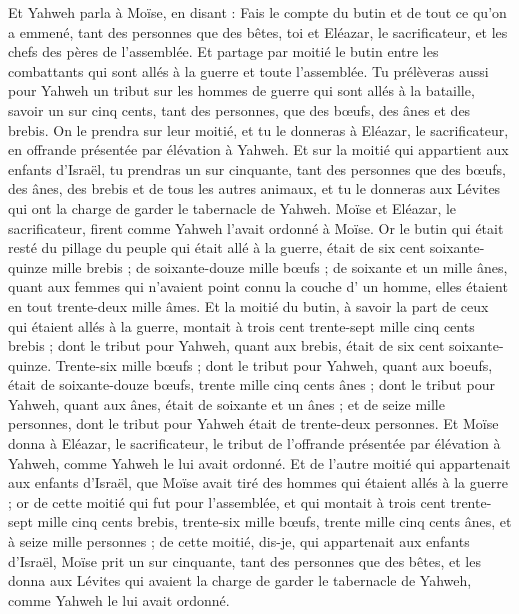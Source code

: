 \begin{multicols}{2}
Et Yahweh parla à Moïse, en disant :
Fais le compte du butin et de tout ce qu'on a emmené, tant des personnes que des bêtes, toi et Eléazar, le sacrificateur, et les chefs des pères de l'assemblée.
Et partage par moitié le butin entre les combattants qui sont allés à la guerre et toute l'assemblée.
Tu prélèveras aussi pour Yahweh un tribut sur les hommes de guerre qui sont allés à la bataille, savoir un sur cinq cents, tant des personnes, que des bœufs, des ânes et des brebis.
On le prendra sur leur moitié, et tu le donneras à Eléazar, le sacrificateur, en offrande présentée par élévation à Yahweh.
Et sur la moitié qui appartient aux enfants d'Israël, tu prendras un sur cinquante, tant des personnes que des bœufs, des ânes, des brebis et de tous les autres animaux, et tu le donneras aux Lévites qui ont la charge de garder le tabernacle de Yahweh.
Moïse et Eléazar, le sacrificateur, firent comme Yahweh l'avait ordonné à Moïse.
Or le butin qui était resté du pillage du peuple qui était allé à la guerre, était de six cent soixante-quinze mille brebis ;
de soixante-douze mille bœufs ;
de soixante et un mille ânes,
quant aux femmes qui n'avaient point connu la couche d' un homme, elles étaient en tout trente-deux mille âmes.
Et la moitié du butin, à savoir la part de ceux qui étaient allés à la guerre, montait à trois cent trente-sept mille cinq cents brebis ;
dont le tribut pour Yahweh, quant aux brebis, était de six cent soixante-quinze.
Trente-six mille bœufs ; dont le tribut pour Yahweh, quant aux boeufs, était de soixante-douze bœufs,
trente mille cinq cents ânes ; dont le tribut pour Yahweh, quant aux ânes, était de soixante et un ânes ;
et de seize mille personnes, dont le tribut pour Yahweh était de trente-deux personnes.
Et Moïse donna à Eléazar, le sacrificateur, le tribut de l'offrande présentée par élévation à Yahweh, comme Yahweh le lui avait ordonné.
Et de l'autre moitié qui appartenait aux enfants d'Israël, que Moïse avait tiré des hommes qui étaient allés à la guerre ;
or de cette moitié qui fut pour l'assemblée, et qui montait à trois cent trente-sept mille cinq cents brebis,
trente-six mille bœufs,
trente mille cinq cents ânes,
et à seize mille personnes ;
de cette moitié, dis-je, qui appartenait aux enfants d'Israël, Moïse prit un sur cinquante, tant des personnes que des bêtes, et les donna aux Lévites qui avaient la charge de garder le tabernacle de Yahweh, comme Yahweh le lui avait ordonné.

\end{multicols}
